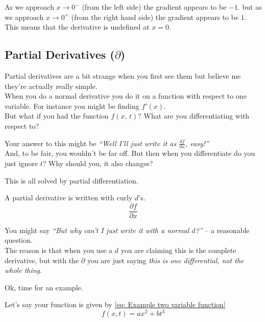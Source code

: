 \documentclass[main.tex]{subfiles}
\begin{document}
                As we approach $x \to 0^-$ (from the left side) the gradient appears to be $-1$. but as we approach $x \to 0^+$ (from the right hand side) the gradient appears to be $1$. This means that the derivative is undefined at $x=0$.


            \newpage
            \subsection{Partial Derivatives ($\partial$)}
                \label{subsec: Partial Derivatives}

                Partial derivatives are a bit strange when you first see them but believe me they're actually really simple.\\
                When you do a normal derivative you do it on a function with respect to one variable. For instance you might be finding $f'(x)$.\\
                But what if you had the function $f(x,\,t)$? What are you differentiating with respect to?

                Your answer to this might be \textit{``Well I'll just write it as $\frac{df}{dx}$, easy!''}\\
                And, to be fair, you wouldn't be far off. But then when you differentiate do you just ignore $t$? Why should you, it also changes?

                This is all solved by partial differentiation.
                \vspace{1em}

                A partial derivative is written with curly $d$'s.
                \begin{equation}
                    \frac{\partial f}{\partial x}
                \end{equation}

                You might say \textit{``But why can't I just write it with a normal $d$?''} -- a reasonable question.\\
                The reason is that when you use a $d$ you are claiming this is the complete derivative, but with the $\partial$ you are just saying \textit{this is one differential, not the whole thing}.
                
                Ok, time for an example.

                Let's say your function is given by \eqref{eq: Example two variable function}
                \begin{equation}
                    f(x, t) = ax^2 + bt^3
                    \label{eq: Example two variable function}
                \end{equation}
\end{document}
